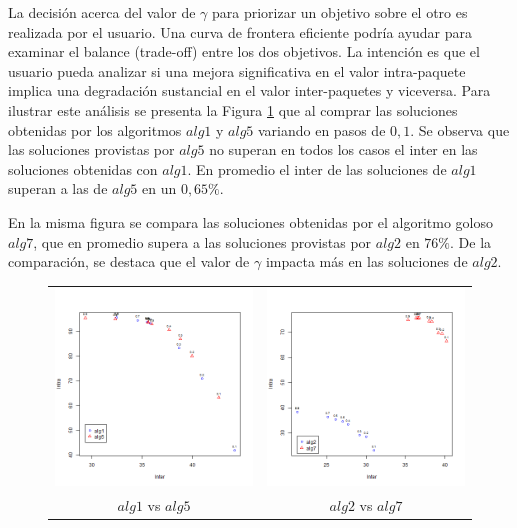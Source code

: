 La decisión acerca del valor de $\gamma$ para priorizar un objetivo sobre el otro es realizada por el usuario. Una curva de frontera eficiente podría ayudar para examinar el balance (trade-off) entre los dos objetivos. La intención es que el usuario pueda analizar si una mejora significativa en el valor intra-paquete implica una degradación sustancial en el valor inter-paquetes y viceversa. Para ilustrar este análisis se presenta la Figura \ref{res:inter_intra}  que al comprar las soluciones obtenidas por los algoritmos $alg1$ y $alg5$ variando en pasos de $0,1$. Se observa que las soluciones provistas por $alg5$ no superan en todos los casos el inter en las soluciones obtenidas con $alg1$. En promedio el inter de las soluciones de $alg1$ superan a las de $alg5$ en un $0,65\%$. 

En la misma figura se compara las soluciones obtenidas por el algoritmo goloso $alg7$, que en promedio supera a las soluciones provistas por $alg2$ en $76\%$. De la comparación, se destaca que el valor de $\gamma$ impacta más en las soluciones de $alg2$.  

\begin{figure}[H]
	\centering
	\begin{tabular}{cc}
			\includegraphics[width=0.5\linewidth]{img/alg1_vs_alg5.png}&
			\includegraphics[width=0.5\linewidth]{img/alg2_vs_alg7.png}\\
			$alg1$ vs $alg5$ & $alg2$ vs $alg7$\\
	\end{tabular}
	\caption{}
	\label{res:inter_intra}
\end{figure}

